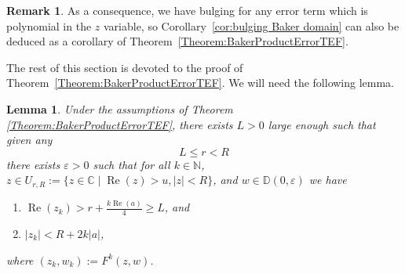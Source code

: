 \documentclass[a4paper, 12pt, twoside]{amsart}
\newtheorem{lem}[thm]{Lemma}
\theoremstyle{definition}
\newtheorem{rem}[thm]{Remark}
\numberwithin{equation}{section}
\renewcommand{\Re}{\operatorname{Re}}
\newcommand{\D}{{\mathbb D}}
\begin{document}
\begin{rem}
	As a consequence, we have bulging for any error term which is polynomial in the $z$ variable, so Corollary~\ref{cor:bulging Baker domain} can also  be deduced as a corollary of Theorem~\ref{Theorem:BakerProductErrorTEF}.
\end{rem}

The rest of this section is devoted to the proof of Theorem~\ref{Theorem:BakerProductErrorTEF}.  We will need the following lemma. 

\begin{lem}\label{Lemma:Baker:RealPartToInftyVar2}
	Under the assumptions of Theorem \ref{Theorem:BakerProductErrorTEF}, there exists $L > 0$ large enough such that given any 
	\begin{equation*} 
		L \leq r < R 
	\end{equation*}
	there exists $\varepsilon >0 $ such that for all $k\in\mathbb{N}$, $z \in U_{r,R} := \lbrace z \in \mathbb{C} \mid \Re(z)>u, \lvert z \rvert < R \rbrace$, and $w \in \D(0,\varepsilon)$ we have
	\begin{enumerate}%
		\item $\Re(z_k)>  r + \frac{k\Re(a)}{4} \ge L$, and \label{Lemma:Baker:RealPartToInftyVar2:ProofProp1}
		\item $ \lvert z_k \rvert < R + 2k \lvert a \rvert$, \label{Lemma:Baker:RealPartToInftyVar2:ProofProp2}
	\end{enumerate}
	where $(z_k, w_k) := F^k(z,w)$.
\end{lem}
\end{document}
